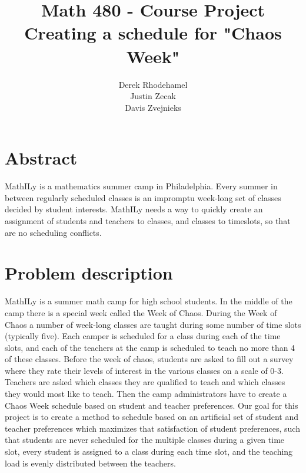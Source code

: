 \documentclass[11pt]{article}
\title{\textbf{Math 480 - Course Project}
			  \\Creating a schedule for "Chaos Week"}
\author{Derek Rhodehamel\\
		Justin Zecak\\
		Davis Zvejnieks}
\date{}
\begin{document}
\maketitle
\section{Abstract}
MathILy is a mathematics summer camp in Philadelphia. Every summer in between regularly scheduled classes is an impromptu week-long set of classes decided by student interests. MathILy needs a way to quickly create an assignment of students and teachers to classes, and classes to timeslots, so that are no scheduling conflicts.
\section{Problem description}
MathILy is a summer math camp for high school students.  In the middle of the camp there is a special week called the Week of Chaos.  During the Week of Chaos a number of week-long classes are taught during some number of time slots (typically five). Each camper is scheduled for a class during each of the time slots, and each of the teachers at the camp is scheduled to teach no more than 4 of these classes.  Before the week of chaos, students are asked to fill out a survey where they rate their levels of interest in the various classes on a scale of 0-3. Teachers are asked which classes they are qualified to teach and which classes they would most like to teach. Then the camp administrators have to create a Chaos Week schedule based on student and teacher preferences. Our goal for this project is to create a method to schedule based on an artificial set of student and teacher preferences which maximizes that satisfaction of student preferences, such that students are never scheduled for the multiple classes during a given time slot, every student is assigned to a class during each time slot, and the teaching load is evenly distributed between the teachers.
\end{document}
